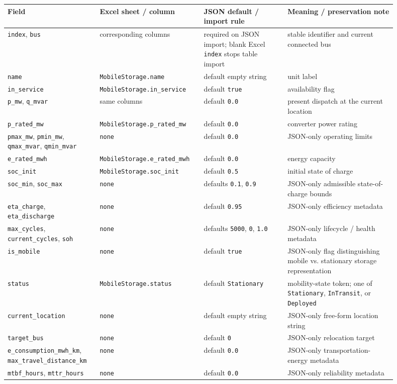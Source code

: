 \begin{longtable}{L{0.20\linewidth}L{0.24\linewidth}L{0.20\linewidth}L{0.26\linewidth}}
\toprule
Field & Excel sheet / column & JSON default / import rule & Meaning / preservation note \\
\midrule
\endhead
\texttt{index}, \texttt{bus} & corresponding columns & required on JSON import; blank Excel \texttt{index} stops table import & stable identifier and current connected bus \\
\texttt{name} & \texttt{MobileStorage.name} & default empty string & unit label \\
\texttt{in\_service} & \texttt{MobileStorage.in\_service} & default \texttt{true} & availability flag \\
\texttt{p\_mw}, \texttt{q\_mvar} & same columns & default \texttt{0.0} & present dispatch at the current location \\
\texttt{p\_rated\_mw} & \texttt{MobileStorage.p\_rated\_mw} & default \texttt{0.0} & converter power rating \\
\texttt{pmax\_mw}, \texttt{pmin\_mw}, \texttt{qmax\_mvar}, \texttt{qmin\_mvar} & \texttt{none} & default \texttt{0.0} & JSON-only operating limits \\
\texttt{e\_rated\_mwh} & \texttt{MobileStorage.e\_rated\_mwh} & default \texttt{0.0} & energy capacity \\
\texttt{soc\_init} & \texttt{MobileStorage.soc\_init} & default \texttt{0.5} & initial state of charge \\
\texttt{soc\_min}, \texttt{soc\_max} & \texttt{none} & defaults \texttt{0.1}, \texttt{0.9} & JSON-only admissible state-of-charge bounds \\
\texttt{eta\_charge}, \texttt{eta\_discharge} & \texttt{none} & default \texttt{0.95} & JSON-only efficiency metadata \\
\texttt{max\_cycles}, \texttt{current\_cycles}, \texttt{soh} & \texttt{none} & defaults \texttt{5000}, \texttt{0}, \texttt{1.0} & JSON-only lifecycle / health metadata \\
\texttt{is\_mobile} & \texttt{none} & default \texttt{true} & JSON-only flag distinguishing mobile vs. stationary storage representation \\
\texttt{status} & \texttt{MobileStorage.status} & default \texttt{Stationary} & mobility-state token; one of \texttt{Stationary}, \texttt{InTransit}, or \texttt{Deployed} \\
\texttt{current\_location} & \texttt{none} & default empty string & JSON-only free-form location string \\
\texttt{target\_bus} & \texttt{none} & default \texttt{0} & JSON-only relocation target \\
\texttt{e\_consumption\_mwh\_km}, \texttt{max\_travel\_distance\_km} & \texttt{none} & default \texttt{0.0} & JSON-only transportation-energy metadata \\
\texttt{mtbf\_hours}, \texttt{mttr\_hours} & \texttt{none} & default \texttt{0.0} & JSON-only reliability metadata \\
\bottomrule
\end{longtable}

